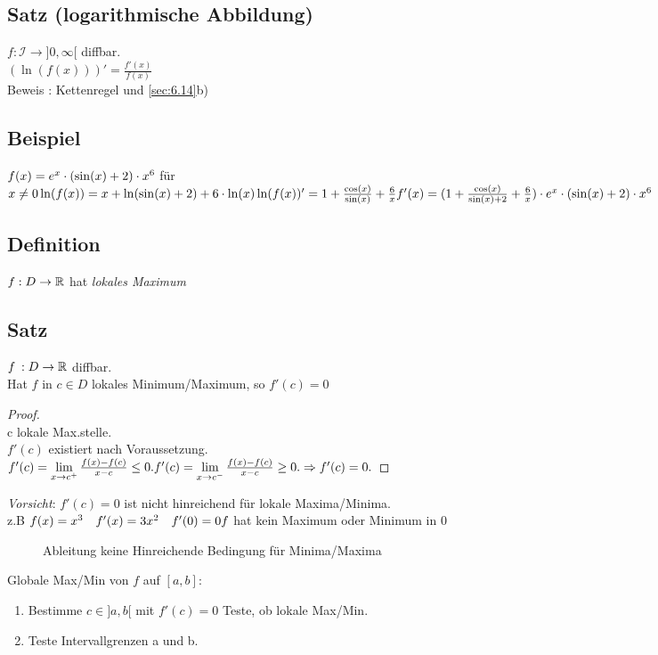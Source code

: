 \subsection{Satz (logarithmische Abbildung)}
$f : \mathcal{I} \to ]0,\infty[$ diffbar.\\
$(\ln(f(x)))' = \frac{f'(x)}{f(x)}$\\
Beweis : Kettenregel und \ref{sec:6.14}b)\\
\subsection{Beispiel}
$f(x) = e^x \cdot (\sin(x) +2) \cdot x^6$ für $x \ne 0\\
\ln(f(x)) = x + \ln(\sin(x) +2) + 6 \cdot \ln(x)\\
\ln(f(x))' = 1 + \frac{\cos(x)}{\sin(x)} + \frac{6}{x}\\
f'(x) = (1 + \frac{\cos(x)}{\sin(x) + 2} + \frac{6}{x}) \cdot e^x \cdot (\sin(x) + 2) \cdot x^6$\\
\subsection{Definition}
$f : D \to \mathbb{R} $ hat \emph{lokales Maximum}
\subsection[Satz]{Satz}\label{sec:6.18}
$f\: : D \to \mathbb{R} $ diffbar.\\
Hat $f$ in $c \in D$ lokales Minimum/Maximum, so $f'(c) =0$
\begin{proof}
\ \\
c lokale Max.stelle.\\
$f'(c)$ existiert nach Voraussetzung.\\
$ f'(c) = \lim\limits_{x \to c^+} \frac{f(x) - f(c)}{x-c}\le 0.\\
f'(c) = \lim\limits_{x \to c^-} \frac{f(x) - f(c)}{x-c}\ge 0.\\
\Rightarrow f'(c) = 0.$
\end{proof}
\noindent\emph{Vorsicht}: $f'(c) = 0$ ist nicht hinreichend für lokale Maxima/Minima.\\
z.B $f(x) = x^3 \quad f'(x) = 3x^2\quad f'(0) = 0\\
f$ hat kein Maximum oder Minimum in 0\\
\begin{figure}[h!]
	\centering
	\caption{Ableitung keine Hinreichende Bedingung für Minima/Maxima}
\end{figure}
Globale Max/Min von $f$ auf $[a,b]$:
\begin{enumerate}[-]
	\item Bestimme $c \in ]a,b[$ mit $f'(c) = 0$ Teste, ob lokale Max/Min.
	\item Teste Intervallgrenzen a und b.
\end{enumerate}
